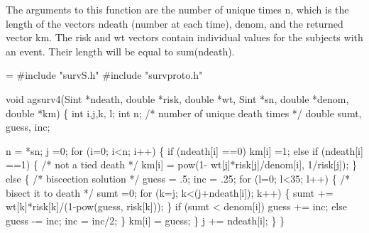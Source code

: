 \documentclass{article}
\begin{document}
The arguments to this function are the number of unique times n, which is
the length of the vectors ndeath (number at each time), denom, and the
returned vector km.  The risk and wt vectors contain individual values for
the subjects with an event.  Their length will be equal to sum(ndeath).
\begin{nwchunk}
=
 #include "survS.h"
 #include "survproto.h"
 
 void agsurv4(Sint   *ndeath,   double *risk,    double *wt,
              Sint   *sn,        double *denom,   double *km) 
 \{
     int i,j,k, l;
     int n;  /* number of unique death times */
     double sumt, guess, inc;    
     
     n = *sn;
     j =0;
     for (i=0; i<n; i++) \{
         if (ndeath[i] ==0) km[i] =1;
         else if (ndeath[i] ==1) \{ /* not a tied death */
             km[i] = pow(1- wt[j]*risk[j]/denom[i], 1/risk[j]);
             \}
         else \{ /* biscection solution */
             guess = .5;
             inc = .25;
             for (l=0; l<35; l++) \{ /* bisect it to death */
                 sumt =0;
                 for (k=j; k<(j+ndeath[i]); k++) \{
                     sumt +=  wt[k]*risk[k]/(1-pow(guess, risk[k]));
                 \}
             if (sumt < denom[i])  guess += inc;
             else          guess -= inc;
             inc = inc/2;
             \}
             km[i] = guess;
         \}
         j += ndeath[i];
     \}
 \}
\end{nwchunk}
\end{document}
